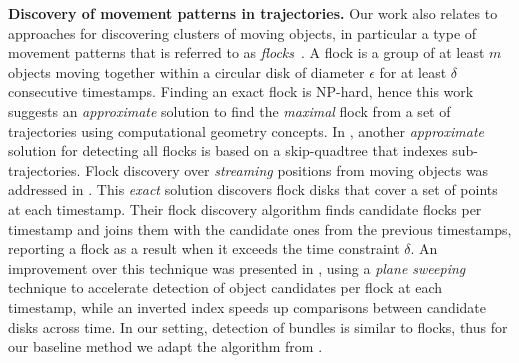 \textbf{Discovery of movement patterns in trajectories.}
Our work also relates to approaches for discovering clusters of moving objects, in particular a type of movement patterns that is referred to as {\em flocks}~\cite{gudmundsson2006computing}. A flock is a group of at least $m$ objects moving together within a circular disk of diameter $\epsilon$ for at least $\delta$ consecutive timestamps. Finding an exact flock is NP-hard, hence this work suggests an \textit{approximate} solution to find the \textit{maximal} flock from a set of trajectories using computational geometry concepts. In \cite{benkert2008reporting}, another \textit{approximate} solution for detecting all flocks is based on a skip-quadtree that indexes sub-trajectories. Flock discovery over {\em streaming} positions from moving objects was addressed in \cite{vieira2009line}. This \textit{exact} solution discovers flock disks that cover a set of points at each timestamp. Their flock discovery algorithm finds candidate flocks per timestamp and joins them with the candidate ones from the previous timestamps, reporting a flock as a result when it exceeds the time constraint $\delta$. An improvement over this technique was presented in \cite{tanaka2015efficient}, using a \textit{plane sweeping} technique to accelerate detection of object candidates per flock at each timestamp, while an inverted index speeds up comparisons between candidate disks across time. In our setting, detection of bundles is similar to flocks, thus for our baseline method we adapt the algorithm from \cite{vieira2009line}.

 

